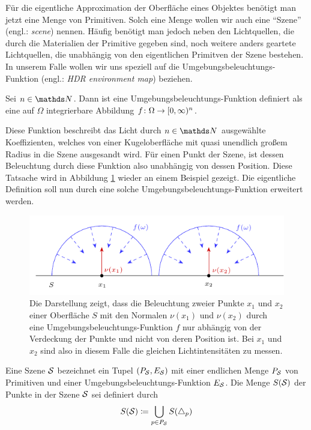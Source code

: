 		Für die eigentliche Approximation der Oberfläche eines Objektes benötigt man jetzt eine Menge von Primitiven.
		Solch eine Menge wollen wir auch eine \enquote{Szene} (engl.: \textit{scene}) nennen.
		Häufig benötigt man jedoch neben den Lichtquellen, die durch die Materialien der Primitive gegeben sind, noch weitere anders geartete Lichtquellen, die unabhängig von den eigentlichen Primitven der Szene bestehen.
		In unserem Falle wollen wir uns speziell auf die Umgebungsbeleuchtungs-Funktion (engl.: \textit{HDR environment map}) beziehen.
		\begin{definition}
			Sei $n\in\SN$.
			Dann ist eine Umgebungsbeleuchtungs-Funktion definiert als eine auf $\Omega$ integrierbare Abbildung $f\colon\Omega\to[0,\infty)^n$.
		\end{definition}

		Diese Funktion beschreibt das Licht durch $n\in\SN$ ausgewählte Koeffizienten, welches von einer Kugeloberfläche mit quasi unendlich großem Radius in die Szene ausgesandt wird.
		Für einen Punkt der Szene, ist dessen Beleuchtung durch diese Funktion also unabhängig von dessen Position.
		Diese Tatsache wird in Abbildung \ref{fig:hdr_environment_map} wieder an einem Beispiel gezeigt.
		Die eigentliche Definition soll nun durch eine solche Umgebungsbeleuchtungs-Funktion erweitert werden.

		\begin{figure}
			\center
			\includegraphics{gg_fig/hdr_environment_map_1.pdf}
			\caption{Die Darstellung zeigt, dass die Beleuchtung zweier Punkte $x_1$ und $x_2$ einer Oberfläche $S$ mit den Normalen $\nu(x_1)$ und $\nu(x_2)$ durch eine Umgebungsbeleuchtungs-Funktion $f$ nur abhängig von der Verdeckung der Punkte und nicht von deren Position ist. Bei $x_1$ und $x_2$ sind also in diesem Falle die gleichen Lichtintensitäten zu messen.}
			\label{fig:hdr_environment_map}
		\end{figure}

		\begin{definition}[Szene]
			Eine Szene $\mathcal{S}$ bezeichnet ein Tupel $(P_{\mathcal{S}},E_{\mathcal{S}})$ mit einer endlichen Menge $P_{\mathcal{S}}$ von Primitiven und einer Umgebungsbeleuchtungs-Funktion $E_{\mathcal{S}}$.
			Die Menge $S(\mathcal{S})$ der Punkte in der Szene $\mathcal{S}$ sei definiert durch
			\[
				S(\mathcal{S}) \coloneqq \bigcup_{p\in P_{\mathcal{S}}} S(\triangle_p)
			\]
		\end{definition}

